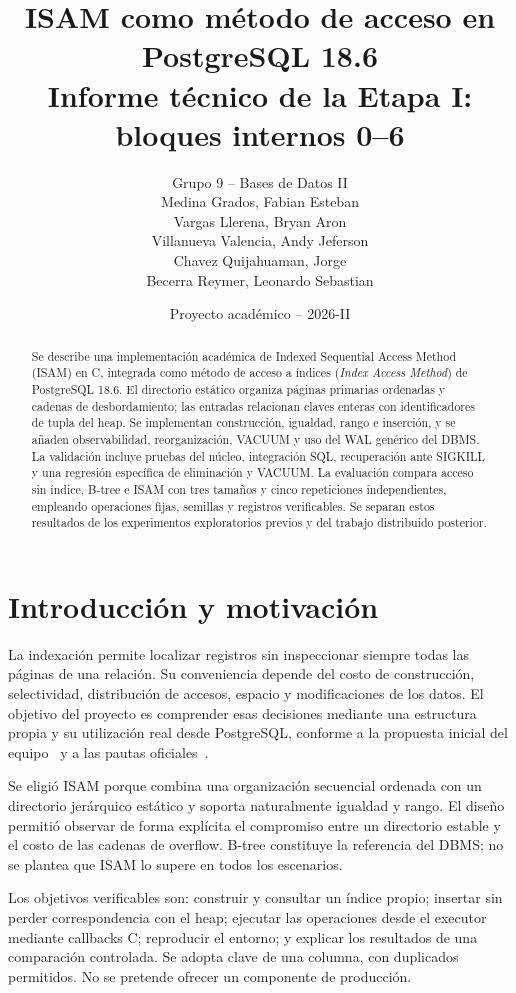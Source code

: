 \documentclass[11pt,a4paper]{article}
\title{ISAM como método de acceso en PostgreSQL 18.6\\
\large Informe técnico de la Etapa I: bloques internos 0--6}
\author{Grupo 9 -- Bases de Datos II\\[5pt]
\small Medina Grados, Fabian Esteban\\
\small Vargas Llerena, Bryan Aron\\
\small Villanueva Valencia, Andy Jeferson\\
\small Chavez Quijahuaman, Jorge\\
\small Becerra Reymer, Leonardo Sebastian}
\date{Proyecto académico -- 2026-II}
\newcommand{\code}[1]{\texttt{\detokenize{#1}}}
\begin{document}
\maketitle

{}
\begin{abstract}
Se describe una implementación académica de Indexed Sequential Access Method
(ISAM) en C, integrada como método de acceso a índices
(\textit{Index Access Method}) de PostgreSQL 18.6. El directorio estático
organiza páginas primarias ordenadas y cadenas de desbordamiento; las
entradas relacionan claves enteras con identificadores de tupla del heap. Se
implementan construcción, igualdad, rango e inserción, y se añaden observabilidad,
reorganización, VACUUM y uso del WAL genérico del DBMS. La validación incluye
pruebas del núcleo, integración SQL, recuperación ante SIGKILL y una regresión
específica de eliminación y VACUUM. La evaluación compara acceso sin índice,
B-tree e ISAM con tres tamaños y cinco repeticiones independientes, empleando
operaciones fijas, semillas y registros verificables. Se separan estos resultados
de los experimentos exploratorios previos y del trabajo distribuido posterior.
\end{abstract}

\tableofcontents
\newpage

\section{Introducción y motivación}

La indexación permite localizar registros sin inspeccionar siempre todas las
páginas de una relación. Su conveniencia depende del costo de construcción,
selectividad, distribución de accesos, espacio y modificaciones de los datos.
El objetivo del proyecto es comprender esas decisiones mediante una estructura
propia y su utilización real desde PostgreSQL, conforme a la propuesta inicial
del equipo~\cite{propuesta} y a las pautas oficiales~\cite{rubrica}.

Se eligió ISAM porque combina una organización secuencial ordenada con un
directorio jerárquico estático y soporta naturalmente igualdad y rango. El diseño
permitió observar de forma explícita el compromiso entre un directorio estable y
el costo de las cadenas de overflow. B-tree constituye la referencia del DBMS;
no se plantea que ISAM lo supere en todos los escenarios.

Los objetivos verificables son: construir y consultar un índice propio; insertar
sin perder correspondencia con el heap; ejecutar las operaciones desde el
executor mediante callbacks C; reproducir el entorno; y explicar los resultados
de una comparación controlada. Se adopta clave \code{int4} de una columna, con
duplicados permitidos. No se pretende ofrecer un componente de producción.
\end{document}
